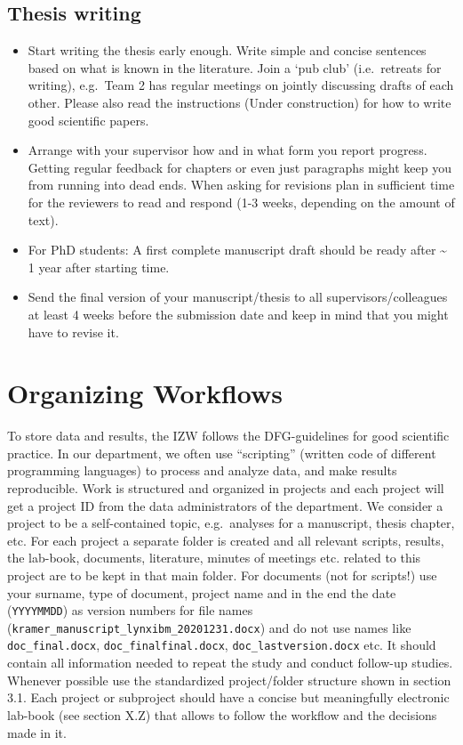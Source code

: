 \documentclass[
  english,
]{article}
\providecommand{\tightlist}{%
  \setlength{\itemsep}{0pt}\setlength{\parskip}{0pt}}
\begin{document}
\hypertarget{thesis-writing}{%
\subsection{Thesis writing}\label{thesis-writing}}

\begin{itemize}
\tightlist
\item
  Start writing the thesis early enough. Write simple and concise
  sentences based on what is known in the literature. Join a `pub club'
  (i.e.~retreats for writing), e.g.~Team 2 has regular meetings on
  jointly discussing drafts of each other. Please also read the
  instructions (Under construction) for how to write good scientific
  papers.
\item
  Arrange with your supervisor how and in what form you report progress.
  Getting regular feedback for chapters or even just paragraphs might
  keep you from running into dead ends. When asking for revisions plan
  in sufficient time for the reviewers to read and respond (1-3 weeks,
  depending on the amount of text).
\item
  For PhD students: A first complete manuscript draft should be ready
  after \textasciitilde{} 1 year after starting time.
\item
  Send the final version of your manuscript/thesis to all
  supervisors/colleagues at least 4 weeks before the submission date and
  keep in mind that you might have to revise it.
\end{itemize}

\hypertarget{organizing-workflows}{%
\section{Organizing Workflows}\label{organizing-workflows}}

To store data and results, the IZW follows the DFG-guidelines for good
scientific practice. In our department, we often use ``scripting''
(written code of different programming languages) to process and analyze
data, and make results reproducible. Work is structured and organized in
projects and each project will get a project ID from the data
administrators of the department. We consider a project to be a
self-contained topic, e.g.~analyses for a manuscript, thesis chapter,
etc. For each project a separate folder is created and all relevant
scripts, results, the lab-book, documents, literature, minutes of
meetings etc. related to this project are to be kept in that main
folder. For documents (not for scripts!) use your surname, type of
document, project name and in the end the date (\texttt{YYYYMMDD}) as
version numbers for file names
(\texttt{kramer\_manuscript\_lynxibm\_20201231.docx}) and do not use
names like \texttt{doc\_final.docx}, \texttt{doc\_finalfinal.docx},
\texttt{doc\_lastversion.docx} etc. It should contain all information
needed to repeat the study and conduct follow-up studies. Whenever
possible use the standardized project/folder structure shown in section
3.1. Each project or subproject should have a concise but meaningfully
electronic lab-book (see section X.Z) that allows to follow the workflow
and the decisions made in it.
\end{document}
